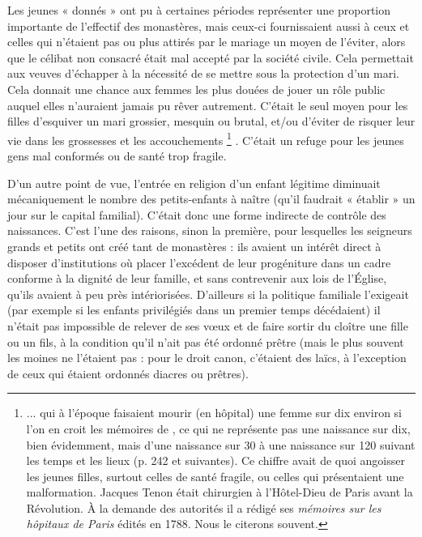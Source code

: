 Les jeunes « donnés » ont pu à certaines périodes représenter une proportion importante de l'effectif des monastères, mais ceux-ci fournissaient aussi à ceux et celles qui n'étaient pas ou plus attirés par le mariage un moyen de l'éviter, alors que le célibat non consacré était mal accepté par la société civile. Cela permettait aux veuves d'échapper à la nécessité de se mettre sous la protection d'un mari. Cela donnait une chance aux femmes les plus douées de jouer un rôle public auquel elles n'auraient jamais pu rêver autrement. C'était le seul moyen pour les filles d'esquiver un mari grossier, mesquin ou brutal, et/ou d'éviter de risquer leur vie dans les grossesses et les accouchements%
\footnote{... qui à l'époque faisaient mourir (en hôpital) une femme sur dix environ si l'on en croit les mémoires de , ce qui ne représente pas une naissance sur dix, bien évidemment, mais d'une naissance sur 30 à une naissance sur 120 suivant les temps et les lieux (p. 242 et suivantes). Ce chiffre avait de quoi angoisser les jeunes filles, surtout celles de santé fragile, ou celles qui présentaient une malformation. Jacques Tenon était chirurgien à l'Hôtel-Dieu de Paris avant la Révolution. À la demande des autorités il a rédigé ses \emph{mémoires sur les hôpitaux de Paris} édités en 1788. Nous le citerons souvent.}%
. C'était un refuge pour les jeunes gens mal conformés ou de santé trop fragile. 

 D'un autre point de vue, l'entrée en religion d'un enfant légitime diminuait mécaniquement le nombre des petits-enfants à naître (qu'il faudrait « établir » un jour sur le capital familial). C'était donc une forme indirecte de contrôle des naissances. C'est l'une des raisons, sinon la première, pour lesquelles les seigneurs grands et petits ont créé tant de monastères : ils avaient un intérêt direct à disposer d'institutions où placer l'excédent de leur progéniture dans un cadre conforme à la dignité de leur famille, et sans contrevenir aux lois de l'Église, qu'ils avaient à peu près intériorisées. D'ailleurs si la politique familiale l'exigeait (par exemple si les enfants privilégiés dans un premier temps décédaient) il n'était pas impossible de relever de ses vœux et de faire sortir du cloître une fille ou un fils, à la condition qu'il n'ait pas été ordonné prêtre (mais le plus souvent les moines ne l'étaient pas : pour le droit canon, c'étaient des laïcs, à l'exception de ceux qui étaient ordonnés diacres ou prêtres).

